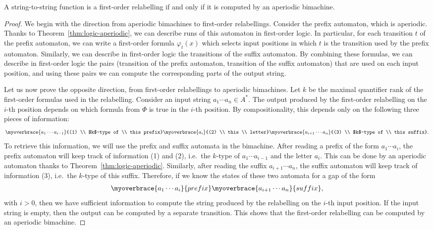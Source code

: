 \begin{theorem}\label{thm:fo-rational-functions}
    A string-to-string function is a first-order relabelling if and only if it is computed by an aperiodic bimachine.
\end{theorem}
\begin{proof}
    We begin with the direction from aperiodic bimachines to first-order relabellings. Consider the prefix automaton, which is aperiodic. 
    Thanks to Theorem~\ref{thm:logic-aperiodic}, we can describe runs of this automaton in first-order logic. In particular, for each transition $t$ of the prefix automaton, we can write a first-order formula $\varphi_t(x)$ which selects input positions in which $t$ is the transition used by the  prefix automaton. Similarly, we can describe in first-order logic the transitions of the suffix automaton. By combining these formulas, we can describe in first-order logic the pairs (transition of the prefix automaton, transition of the suffix automaton) that are used on each input position, and using these pairs we can compute the corresponding parts of the output string. 
    
    Let us now prove the opposite direction, from first-order relabellings to aperiodic bimachines. Let $k$ be the maximal quantifier rank of the first-order formulas used in the relabelling. Consider an input string $a_1 \cdots a_n \in A^*$. The output produced by the first-order relabelling on the $i$-th position depends on which formula from $\Phi$ is true in the $i$-th position. By compositionality, this  depends only on the following three pieces of information:
    \begin{align*}
    \myoverbrace{a_1 \cdots a_{i-1}}{(1) \\ $k$-type of \\ this prefix}
    \myoverbrace{a_i}{(2) \\ this \\ letter}
    \myoverbrace{a_{i+1} \cdots a_n}{(3) \\ $k$-type of \\ this suffix}.
    \end{align*}
    To retrieve this information, we will use the prefix and suffix automata in the bimachine. After reading a prefix of the form $a_1 \cdots a_{i}$, the prefix automaton will keep track of information (1) and (2), i.e.~the $k$-type of $a_1 \cdots a_{i-1}$ and the letter $a_i$. This can be done by an aperiodic automaton thanks to Theorem~\ref{thm:logic-aperiodic}. Similarly, after reading the suffix $a_{i+1} \cdots a_n$, the suffix automaton will keep track of information (3), i.e.~the $k$-type of this suffix. Therefore, if we know the states of these two automata for a gap of the form 
    \begin{align*}
    \myoverbrace{a_1 \cdots a_i}{prefix}
    \myoverbrace{a_{i+1} \cdots a_n}{suffix},
    \end{align*}
    with $i > 0$,
    then we have sufficient information to compute the string produced by the relabelling on the $i$-th input position.  If the input string is empty, then the output can be computed by a separate transition. This shows that the first-order relabelling can be computed by an aperiodic bimachine.
\end{proof}
